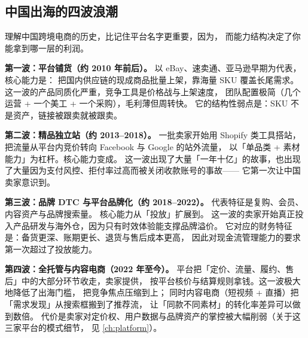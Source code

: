 \subsection{中国出海的四波浪潮}

理解中国跨境电商的历史，比记住平台名字更重要，因为，
而能力结构决定了你能拿到哪一层的利润。

\textbf{第一波：平台铺货（约 2010 年前后）。}
以 eBay、速卖通、亚马逊早期为代表，核心能力是：
把国内供应链的现成商品批量上架，靠海量 SKU 覆盖长尾需求。
这一波的产品同质化严重，竞争工具是价格战与上架速度，
团队配置极简（几个运营 + 一个美工 + 一个采购），毛利薄但周转快。
它的结构性弱点是：SKU 不是资产，链接被跟卖就被跟卖。

\textbf{第二波：精品独立站（约 2013--2018）。}
一批卖家开始用 Shopify 类工具搭站，把流量从平台内竞价转向 Facebook 与 Google 的站外流量，
以「单品类 + 素材能力」为杠杆。核心能力变成。
这一波出现了大量「一年十亿」的故事，也出现了大量因为支付风控、拒付率过高而被关闭收款账号的事故——
它第一次让中国卖家意识到。

\textbf{第三波：品牌 DTC 与平台品牌化（约 2018--2022）。}
代表特征是复购、会员、内容资产与品牌搜索量。
核心能力从「投放」扩展到。
这一波的卖家开始真正投入产品研发与海外仓，因为只有时效体验能支撑品牌溢价。
它对应的财务特征是：备货更深、账期更长、退货与售后成本更高，
因此对现金流管理能力的要求第一次超过了投放能力。

\textbf{第四波：全托管与内容电商（2022 年至今）。}
平台把「定价、流量、履约、售后」中的大部分环节收走，卖家提供，
按平台核价与结算规则拿钱。这一波极大地降低了出海门槛，
把竞争焦点压缩到上；
同时内容电商（短视频 + 直播）把「需求发现」从搜索框搬到了推荐流，
让「同款不同素材」的转化率差异可以做到数倍。
代价是卖家对定价权、用户数据与品牌资产的掌控被大幅削弱（关于这三家平台的模式细节，
见 \cref{ch:platform}）。

